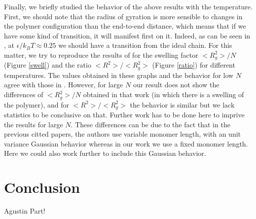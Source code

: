 \documentclass[aps,prl,reprint,groupedaddress]{revtex4-1}
\begin{document}
Finally, we briefly studied the behavior of the above results with the temperature. First, we should note that the radius of gyration is more sensible to changes in the polymer configuration than the end-to-end distance, which means that if we have some kind of transition, it will manifest first on it. Indeed, as can be seen in \cite{Witt1996}, at $\epsilon/k_B T \approx 0.25$ we should have a transition from the ideal chain. For this matter, we try to reproduce the results of \cite{Grassberger1997} for the swelling factor $<R_g^2>/N$ (Figure \ref{swell}) and the ratio $<R^2>/<R_g^2>$ (Figure \ref{ratio}) for different temperatures. The values obtained in these graphs and the behavior for low $N$ agree with those in \cite{Grassberger1997}. However, for large $N$ our result does not show the differences of $<R_g^2>/N$ obtained in that work (in which there is a swelling of the polymer), and for $<R^2>/<R_g^2>$ the behavior is similar but we lack statistics to be conclusive on that. Further work has to be done here to imprive the results for large $N$. These differences can be due to the fact that in the previous citted papers, the authors use variable monomer length, with an unit variance Gaussian behavior whereas in our work we use a fixed monomer length. Here we could also work further to include this Gaussian behavior. 

\section{Conclusion \label{conclusion}}
Agustin Part!


\end{document}
